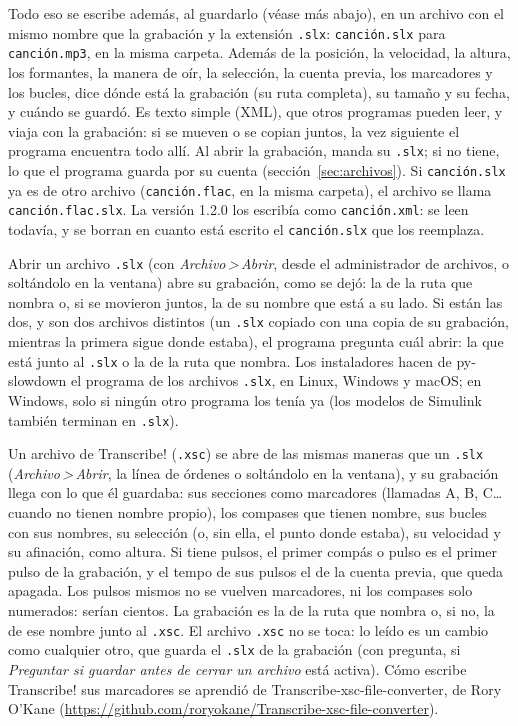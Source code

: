\documentclass[12pt,
              article,
              oneside
              ]{memoir}
\newcommand*{\menu}[1]{\textit{#1}}
\newcommand*{\then}{\,>\,}
\begin{document}
%
Todo eso se escribe además, al guardarlo (véase más abajo), en un archivo con el
mismo nombre que la grabación y la extensión \texttt{.slx}:
\texttt{canción.slx} para \texttt{canción.mp3}, en la misma carpeta. Además de la posición, la
velocidad, la altura, los formantes, la manera de oír, la selección, la
cuenta previa, los marcadores y los bucles, dice dónde está la grabación (su
ruta completa), su tamaño y su fecha, y cuándo se guardó. Es texto simple (XML),
que otros programas pueden leer, y viaja con la grabación: si se mueven o
se copian juntos, la vez siguiente el programa encuentra todo allí. Al abrir
la grabación, manda su \texttt{.slx}; si no tiene, lo que el programa
guarda por su cuenta (sección~\ref{sec:archivos}). Si \texttt{canción.slx}
ya es de otro archivo (\texttt{canción.flac}, en la misma carpeta), el
archivo se llama \texttt{canción.flac.slx}. La versión 1.2.0 los escribía
como \texttt{canción.xml}: se leen todavía, y se borran en cuanto está
escrito el \texttt{canción.slx} que los reemplaza.

%
Abrir un archivo \texttt{.slx} (con \menu{Archivo\then Abrir}, desde el
administrador de archivos, o soltándolo en la ventana) abre su grabación,
como se dejó: la de la ruta que nombra o, si se movieron juntos, la de su
nombre que está a su lado. Si están las dos, y son dos archivos distintos
(un \texttt{.slx} copiado con una copia de su grabación, mientras la
primera sigue donde estaba), el programa pregunta cuál abrir: la que está
junto al \texttt{.slx} o la de la ruta que nombra. Los instaladores hacen de py-slowdown el
programa de los archivos \texttt{.slx}, en Linux, Windows y macOS; en
Windows, solo si ningún otro programa los tenía ya (los modelos de Simulink
también terminan en \texttt{.slx}).

%
Un archivo de Transcribe! (\texttt{.xsc}) se abre de las mismas maneras que
un \texttt{.slx} (\menu{Archivo\then Abrir}, la línea de órdenes o
soltándolo en la ventana), y su grabación llega con lo que él guardaba: sus secciones como marcadores
(llamadas A, B, C\ldots{} cuando no tienen nombre propio), los compases que
tienen nombre, sus bucles con sus nombres, su selección (o, sin ella, el
punto donde estaba), su velocidad y su afinación, como altura. Si tiene
pulsos, el primer compás o pulso es el primer pulso de la grabación, y el
tempo de sus pulsos el de la cuenta previa, que queda apagada. Los pulsos
mismos no se vuelven marcadores, ni los compases solo numerados: serían
cientos. La grabación es la de la ruta que nombra o, si no, la de ese nombre
junto al \texttt{.xsc}. El archivo \texttt{.xsc} no se toca: lo leído es un
cambio como cualquier otro, que guarda el \texttt{.slx} de la grabación (con
pregunta, si \menu{Preguntar si guardar antes de cerrar un archivo} está
activa). Cómo escribe Transcribe! sus marcadores se aprendió de
Transcribe-xsc-file-converter, de Rory O'Kane
(\url{https://github.com/roryokane/Transcribe-xsc-file-converter}).
\end{document}
